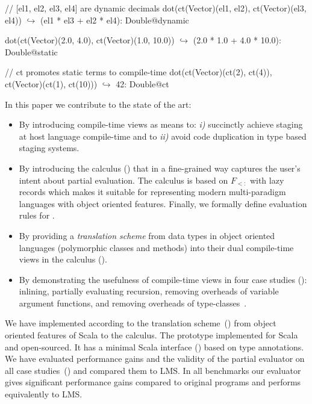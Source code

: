 \vspace{1.8mm}
\begin{listing}[mathescape]
  // [el1, el2, el3, el4] are dynamic decimals
  dot(ct(Vector)(el1, el2), ct(Vector)(el3, el4))
    $\hookrightarrow$ (el1 * el3 + el2 * el4): Double@dynamic

  dot(ct(Vector)(2.0, 4.0), ct(Vector)(1.0, 10.0))
    $\hookrightarrow$ (2.0 * 1.0 + 4.0 * 10.0): Double@static

  // ct promotes static terms to compile-time
  dot(ct(Vector)(ct(2), ct(4)),
      ct(Vector)(ct(1), ct(10)))
    $\hookrightarrow$ 42: Double@ct
\end{listing}
\vspace{1.8mm}

In this paper we contribute to the state of the art:
\begin{itemize}

 \item By introducing compile-time views as means to: \emph{i)} succinctly achieve staging
 at host language compile-time and to \emph{ii)} avoid code duplication in type based
 staging systems.

 \item By introducing the \calculus calculus () that in a
  fine-grained way captures the user's intent about partial evaluation. The calculus
  is based on $F_{<:}$ with lazy records which makes it suitable for representing
  modern multi-paradigm languages with object oriented features. Finally,
  we formally define evaluation rules for \calculus.

 \item By providing a \emph{translation scheme} from data types in object oriented languages
  (polymorphic classes and methods) into their dual compile-time views in the
  \calculus calculus ().

 \item By demonstrating the usefulness of compile-time views in four case
 studies (): inlining, partially evaluating recursion,
 removing overheads of variable argument functions, and removing overheads of
 type-classes~\cite{oliveira2010type}.

\end{itemize}

We have implemented \tool according to the translation
 scheme~() from object oriented features of Scala to
 the \calculus calculus. The prototype implemented for Scala and
 open-sourced\footnotemark[3]. It has a minimal Scala
 interface () based on type annotations. We have evaluated
 performance gains and the validity of the partial evaluator on all case
 studies~() and compared them to LMS. In all benchmarks
 our evaluator gives significant performance gains compared to original programs and
 performs equivalently to LMS.
